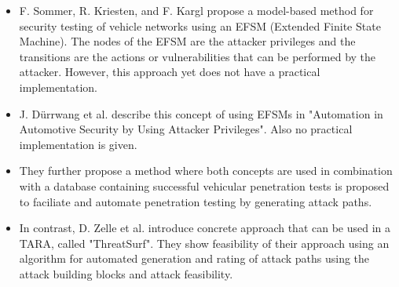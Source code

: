 \begin{itemize}

\item F. Sommer, R. Kriesten, and F. Kargl propose a model-based method for security testing of vehicle networks\cite{model_based_testing} using an EFSM (Extended Finite State Machine). 
The nodes of the EFSM are the attacker privileges and the transitions are the actions or vulnerabilities that can be performed by the attacker.
However, this approach yet does not have a practical implementation.

\item J. Dürrwang et al. describe this concept of using EFSMs in "Automation in Automotive Security by Using Attacker Privileges"\cite{attacker_privileges}.
Also no practical implementation is given.

\item They further propose a method where both concepts are used in combination with a database containing successful vehicular penetration tests is proposed to faciliate and automate penetration testing by generating attack paths\cite{attack_database}.

\item In contrast, D. Zelle et al. introduce concrete approach that can be used in a TARA, called "ThreatSurf"\cite{threat_surf}.
They show feasibility of their approach using an algorithm for automated generation and rating of attack paths using the attack building blocks and attack feasibility.

\end{itemize}



